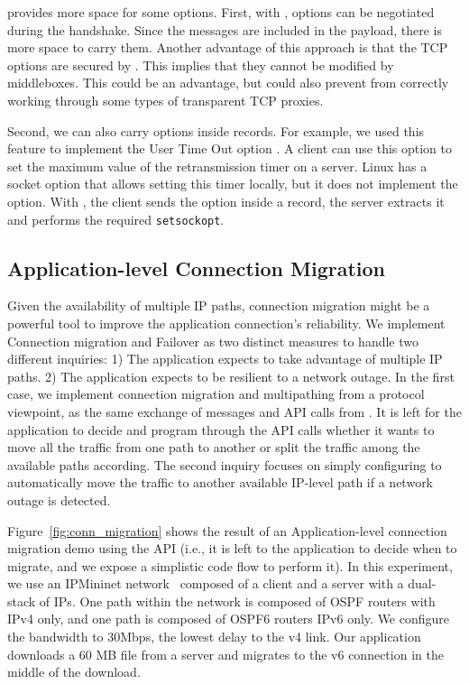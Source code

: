 \tcpls provides more space for some \tcp options. First, with \tcpls, \tcp
options can be negotiated during the \tls handshake. Since the \tls messages are
included in the \tcp payload, there is more space to carry them. Another
advantage of this approach is that the TCP options are secured by \tls. This
implies that they cannot be modified by middleboxes. This could be an advantage,
but could also prevent \tcpls from correctly working through some types of
transparent TCP proxies.

Second, we can also carry \tcp options inside \tls records. For example, we used
this feature to implement the \tcp User Time Out option \cite{rfc5482}. A client
can use this option to set the maximum value of the retransmission
timer on a server. Linux \tcp has a socket option that allows setting
this timer locally, but it does not implement the option. With \tcpls, the client sends the option inside a \tls record, the server extracts it
and performs the required \texttt{setsockopt}.


\subsection{Application-level Connection Migration}
\label{sec:connmigr}

Given the availability of multiple IP paths, connection migration might be a
powerful tool to improve the application connection's reliability.  We
implement Connection migration and Failover as two distinct measures to handle
two different inquiries: 1) The application expects to take advantage of multiple
IP paths. 2) The application expects to be resilient to a network outage. In the
first case, we implement connection migration and multipathing from a
protocol viewpoint, as the same exchange of messages and API calls from \tcpls.
It is left for the application to decide and program
through the API calls whether it wants to move all the traffic from one path to
another or split the traffic among the available paths according. The second
inquiry focuses on simply configuring \tcpls to automatically move the traffic to
another available IP-level path if a network outage is detected.

Figure~\ref{fig:conn_migration} shows the result of an Application-level
connection migration demo using the API (i.e., it is left to the
application to decide when to migrate, and we expose a simplistic code flow to
perform it). In this experiment, we use an IPMininet network~\cite{ipmininet, jadin2020educational}
composed of a client and a server with a dual-stack of IPs. One path within the
network is composed of OSPF routers with IPv4 only, and one path is composed of
OSPF6 routers IPv6 only. We configure the bandwidth to 30Mbps, the lowest delay
to the v4 link. Our application
downloads a 60 MB file from a server and migrates to the v6 connection in
the middle of the download.

